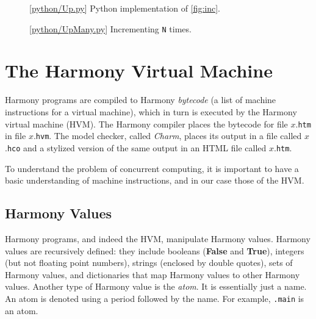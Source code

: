 \documentclass{report}
\newcommand{\harmonylink}[1]{%
[\href{https://harmony.cs.cornell.edu/#1}{\underline{#1}}]%
}
\newenvironment{code}{
\tcolorbox
}{
\endtcolorbox
}
\begin{document}
\begin{figure}
\begin{code}
\end{code}
\caption{\harmonylink{python/Up.py} Python implementation of \autoref{fig:inc}.}
\label{fig:incpy}
\end{figure}

\begin{figure}
\begin{code}
\end{code}
\caption{\harmonylink{python/UpMany.py} Incrementing \texttt{N} times.}
\label{fig:incmany}
\end{figure}

\chapter{The Harmony Virtual Machine}
\label{ch:harmonymachine}
%

Harmony programs are compiled to Harmony \emph{bytecode}
%
(a list of machine instructions for a virtual machine),
which in turn is executed by the Harmony virtual machine (HVM).
%
%
%
The Harmony compiler places the bytecode for file $x$.\texttt{htm} in
file $x$.\texttt{hvm}.
The model checker, called \emph{Charm}, places its output in a file
called $x$.\texttt{hco} and a stylized version of the same output
in an HTML file called $x$.\texttt{htm}.

To understand the problem of concurrent computing, it
is important to have a basic understanding of machine instructions,
and in our case those of the HVM.

\section*{Harmony Values}

Harmony programs, and indeed the HVM,  manipulate Harmony values.
Harmony values are recursively defined:
they include booleans (\textbf{False} and \textbf{True}),
integers (but not floating point numbers),
strings (enclosed by double quotes),
sets of Harmony values,
and dictionaries
%
that map Harmony values to other Harmony values.
%
Another type of Harmony value is the \emph{atom}.
%
It is essentially
just a name.  An atom is denoted using a period followed by the
name.  For example, \texttt{.main} is an atom.
\end{document}
